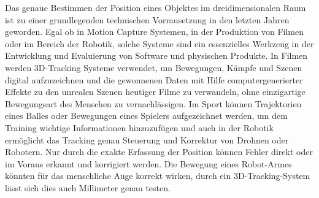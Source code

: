 \documentclass[../main.tex]{subfiles}
\begin{document}
Das genaue Bestimmen der Position eines Objektes im dreidimensionalen Raum ist zu einer grundlegenden technischen Vorrausetzung in den letzten Jahren geworden. Egal ob in Motion Capture Systemen, in der Produktion von Filmen oder im Bereich der Robotik, solche Systeme sind ein essenzielles Werkzeug in der Entwicklung und Evaluierung von Software und physischen Produkte. In Filmen werden 3D-Tracking Systeme verwendet, um Bewegungen, Kämpfe und Szenen digital aufzuzeichnen und die gewonnenen Daten mit Hilfe computergenerierter Effekte zu den unrealen Szenen heutiger Filme zu verwandeln, ohne einzigartige Bewegungsart des Menschen zu vernachlässigen. Im Sport können Trajektorien eines Balles oder Bewegungen eines Spielers aufgezeichnet werden, um dem Training wichtige Informationen hinzuzufügen und auch in der Robotik ermöglicht das Tracking genau Steuerung und Korrektur von Drohnen oder Robotern. Nur durch die exakte Erfassung der Position können Fehler direkt oder im Voraus erkannt und korrigiert werden. Die Bewegung eines Robot-Armes könnten für das menschliche Auge korrekt wirken, durch ein 3D-Tracking-System lässt sich dies auch Millimeter genau testen. 
\end{document}
